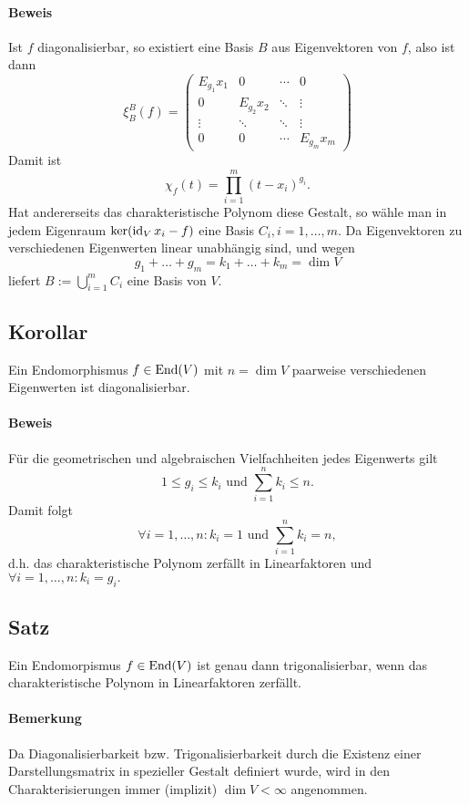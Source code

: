 \paragraph{Beweis}
	Ist $ f $ diagonalisierbar, so existiert eine Basis $ B $ aus Eigenvektoren von $ f $, also ist dann
		\[ \xi_B^B(f) =
			\begin{pmatrix}
				E_{g_1}x_1 &0& \cdots & 0 \\
				0 &E_{g_2}x_2& \ddots & \vdots\\
				\vdots & \ddots& \ddots & \vdots\\
				0 & 0 & \cdots & E_{g_m}x_m 
			\end{pmatrix} \]
	Damit ist
		\[ \chi_f(t)=\prod_{i=1}^{m}(t-x_i)^{g_i}. \]
	Hat andererseits das charakteristische Polynom diese Gestalt, so wähle man in jedem Eigenraum $ \ker(\operatorname{id}_Vx_i-f) $ eine Basis $ C_i,i=1,\dots,m $. Da Eigenvektoren zu verschiedenen Eigenwerten linear unabhängig sind, und wegen
		\[ g_1+\dots+g_m = k_1 + \dots + k_m = \dim V \]
	liefert $ B := \bigcup_{i=1}^mC_i $ eine Basis von $ V $.
\subsection{Korollar}
	\begin{Korollar}
		Ein Endomorphismus $ f\in\operatorname{End}(V) $ mit $ n=\dim V $ paarweise verschiedenen Eigenwerten ist diagonalisierbar.
	\end{Korollar}
\paragraph{Beweis}
	Für die geometrischen und algebraischen Vielfachheiten jedes Eigenwerts gilt
		\[ 1\leq g_i \leq k_i \text{ und } \sum_{i=1}^{n}k_i \leq n. \]
	Damit folgt
		\[ \forall i=1,\dots,n:k_i = 1 \text{ und } \sum_{i=1}^{n}k_i = n, \]
	d.h. das charakteristische Polynom zerfällt in Linearfaktoren und $ \forall i=1,\dots,n:k_i=g_i. $
\subsection{Satz}
\begin{Satz}
	Ein Endomorpismus $ f\in\operatorname{End}(V) $ ist genau dann trigonalisierbar, wenn das charakteristische Polynom in Linearfaktoren zerfällt.
\end{Satz}
\paragraph{Bemerkung}
	Da Diagonalisierbarkeit bzw. Trigonalisierbarkeit durch die Existenz einer Darstellungsmatrix in spezieller Gestalt definiert wurde, wird in den Charakterisierungen immer (implizit) $ \dim V < \infty $ angenommen.
